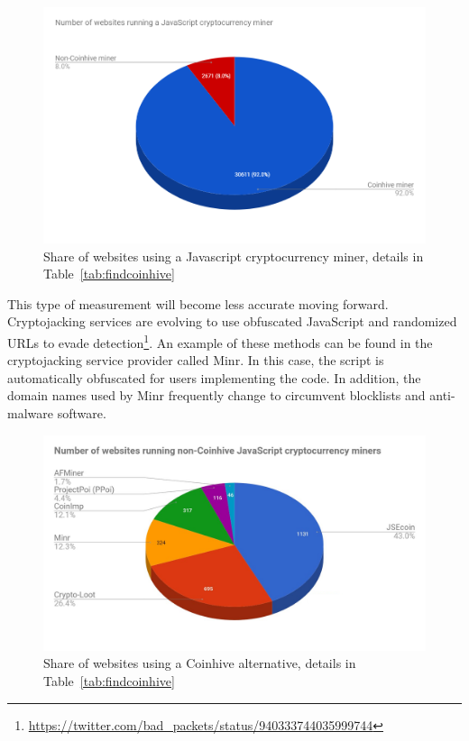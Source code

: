 \begin{figure}[t]
\centering
\includegraphics[width=0.9\linewidth]{figures/coinhive-miners-pie.png}
\caption{Share of websites using a Javascript cryptocurrency miner, details in Table~\ref{tab:findcoinhive}  \label{fig:coinhivevscopycats}}
\end{figure}


This type of measurement will become less accurate moving forward. Cryptojacking services are evolving to use obfuscated JavaScript and randomized URLs to evade detection\footnote{\url{https://twitter.com/bad_packets/status/940333744035999744}}. An example of these methods can be found in the cryptojacking service provider called Minr. In this case, the script is automatically obfuscated for users implementing the code. In addition, the domain names used by Minr frequently change to circumvent blocklists and anti-malware software.





\begin{figure}[t]
\centering
\includegraphics[width=0.9\linewidth]{figures/non-coinhive-miners-pie.png}
\caption{Share of websites using a Coinhive alternative, details in Table~\ref{tab:findcoinhive} } \label{fig:copycat}
\end{figure}


